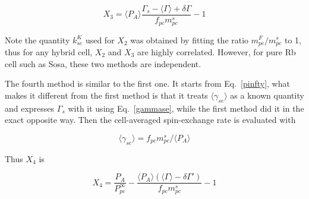 \begin{equation}
X_3=\langle P_A\rangle\frac{\Gamma_s-\langle\Gamma\rangle+\delta\Gamma}{f_{pc}m_{pc}^s}-1
\end{equation}

Note the quantity $k_{se}^K$ used for $X_2$ was obtained by fitting the ratio $m_{pc}^F/m_{pc}^s$ to 1, thus for any hybrid cell, $X_2$ and $X_3$ are highly correlated. However, for pure Rb cell such as Sosa, these two methods are independent.

The fourth method is similar to the first one. It starts from Eq.~\ref{pinfty}, what makes it different from the first method is that it treats $\langle\gamma_{se}\rangle$ as a known quantity and expresses $\Gamma_s$ with it using Eq.~\ref{gammase}, while the first method did it in the exact opposite way. Then the cell-averaged spin-exchange rate is evaluated with 

\begin{equation}
\langle\gamma_{se}\rangle=f_{pc}m_{pc}^s/\langle P_A\rangle
\end{equation}

Thus $X_4$ is

\begin{equation}
X_4=\frac{P_A}{P_{pc}^\infty}-\frac{\langle P_A\rangle(\langle\Gamma\rangle-\delta\Gamma')}{f_{pc}m_{pc}^s}-1
\end{equation}

